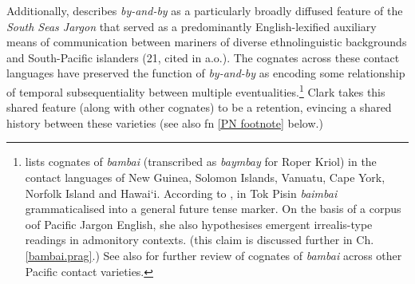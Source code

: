 Additionally, \citet{Clark1979} describes \textit{by-and-by} as a particularly broadly diffused feature of the \textit{South Seas Jargon} that served as a predominantly English-lexified auxiliary means of communication between mariners of diverse ethnolinguistic backgrounds and South-Pacific islanders (21, cited in \citealt[262\textit{ff}]{Harris1986a} a.o.). The cognates across these contact languages have preserved the function of \textit{by-and-by} as encoding some relationship of temporal subsequentiality between multiple eventualities.\footnote{\citet[10-11]{Clark1979} lists cognates of \textit{bambai} (transcribed as \textit{baymbay} for Roper Kriol) in the contact languages of New Guinea, Solomon Islands, Vanuatu, Cape York, Norfolk Island and Hawai`i. According to \citet{Romaine1995}, in Tok Pisin \textit{baimbai} grammaticalised into a general future tense marker. On the basis of a corpus oof Pacific Jargon English, she also hypothesises emergent irrealis-type readings in admonitory contexts. (this claim is discussed further in Ch. \ref{bambai.prag}.) See also \citealt{Angelo2016} for further review of cognates of \textit{bambai} across other Pacific contact varieties.} Clark takes this shared feature (along with other cognates) to be a retention, evincing a shared history between these varieties (see also fn \ref{PN footnote} below.) 

